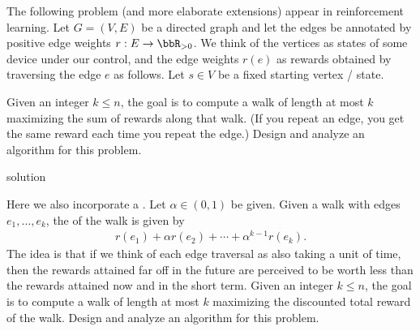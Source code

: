 \documentclass{article}
\begin{document}
 The following problem (and more elaborate extensions) appear in
reinforcement learning. Let $G = (V, E)$ be a directed graph and let the edges be
annotated by positive edge weights $r : E \to \bbR_{>0}$. We think of the vertices as states
of some device under our control, and the edge weights $r(e)$ as rewards obtained by
traversing the edge $e$ as follows. Let $s \in V$ be a fixed starting vertex / state.

\setcounter{section}{8}
\setcounter{exercise}{2}
\begin{subexercise}
Given an integer $ k\leq n $, the goal is to compute a walk of length at most $ k $ maximizing the sum of rewards along that walk. (If you repeat an edge, you
get the same reward each time you repeat the edge.) Design and analyze an
algorithm for this problem.
\end{subexercise}

\begin{solution}
solution
\end{solution}
\pagebreak

\begin{subexercise}
  Here we also incorporate a .
  Let $ \alpha\in (0,1) $ be given.
  Given a walk with edges $e_1,\ldots, e_k$, the  of the walk is given by
  \begin{align*}
    r(e_1)+\alpha r(e_2) + \cdots + \alpha^{k-1}r(e_k).
  \end{align*}
  The idea is that if we think of each edge traversal as also taking a unit of time, then the rewards attained far off in the future are perceived to be worth less than the rewards attained now and in the short term.
  Given an integer $k \leq n$, the goal is to compute a walk of length at most $k$ maximizing the discounted total reward of the walk.
  Design and analyze an algorithm for this problem.
\end{subexercise}

\begin{solution}

\end{solution}
\end{document}
